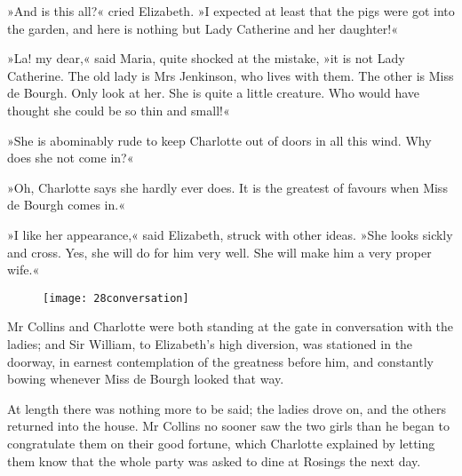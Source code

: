 »And is this all?« cried Elizabeth. »I expected at least that the pigs were got into the garden, and here is nothing but Lady Catherine and her daughter!«

»La! my dear,« said Maria, quite shocked at the mistake, »it is not Lady Catherine. The old lady is Mrs Jenkinson, who lives with them. The other is Miss de Bourgh. Only look at her. She is quite a little creature. Who would have thought she could be so thin and small!«

»She is abominably rude to keep Charlotte out of doors in all this wind. Why does she not come in?«

»Oh, Charlotte says she hardly ever does. It is the greatest of favours when Miss de Bourgh comes in.«

»I like her appearance,« said Elizabeth, struck with other ideas. »She looks sickly and cross. Yes, she will do for him very well. She will make him a very proper wife.«

\begin{figure}[tbh]
\centering
\texttt{[image: 28conversation]}
\end{figure}

Mr Collins and Charlotte were both standing at the gate in conversation with the ladies; and Sir William, to Elizabeth's high diversion, was stationed in the doorway, in earnest contemplation of the greatness before him, and constantly bowing whenever Miss de Bourgh looked that way.

At length there was nothing more to be said; the ladies drove on, and the others returned into the house. Mr Collins no sooner saw the two girls than he began to congratulate them on their good fortune, which Charlotte explained by letting them know that the whole party was asked to dine at Rosings the next day.